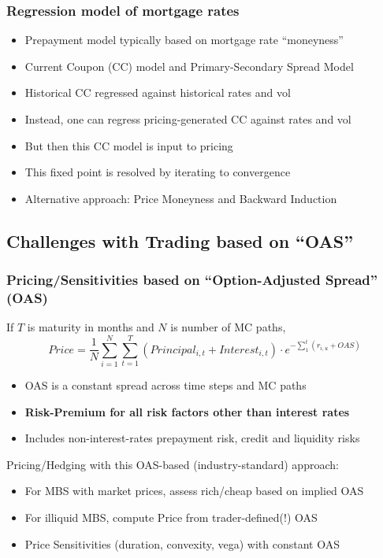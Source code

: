 \documentclass{beamer}
\begin{document}
\begin{frame}
\frametitle{Regression model of mortgage rates}
\begin{itemize}
\item Prepayment model typically based on mortgage rate ``moneyness''
\item Current Coupon (CC) model and Primary-Secondary Spread Model
\item Historical CC regressed against historical rates and vol
\item Instead, one can regress pricing-generated CC against rates and vol
\item But then this CC model is input to pricing
\item This fixed point is resolved by iterating to convergence
\item Alternative approach: Price Moneyness and Backward Induction
\end{itemize}
\end{frame}


\subsection{Challenges with Trading based on ``OAS''}
\begin{frame}
\frametitle{Pricing/Sensitivities based on ``Option-Adjusted Spread'' (OAS)}
If $T$ is maturity in months and $N$ is number of MC paths, 
$$Price = \frac 1 N \sum_{i=1}^N \sum_{t=1}^T (Principal_{i,t} + Interest_{i,t}) \cdot e^{-\sum_1^t (r_{i,u} + OAS)}$$
\begin{itemize}
\item OAS is a constant spread across time steps and MC paths
\item {\bf Risk-Premium for all risk factors other than interest rates}
\item Includes non-interest-rates prepayment risk, credit and liquidity risks
\end{itemize}

Pricing/Hedging with this OAS-based (industry-standard) approach:

\begin{itemize}
\item For MBS with market prices, assess rich/cheap based on implied OAS
\item For illiquid MBS, compute Price from trader-defined(!) OAS
\item Price Sensitivities (duration, convexity, vega) with constant OAS
\end{itemize}
\end{frame}
\end{document}
